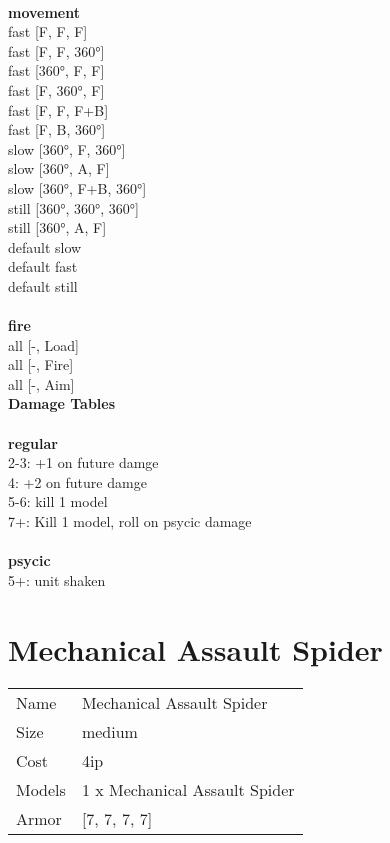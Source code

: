 \ \\ {\bf movement } \\
fast [F, F, F] \\
fast [F, F, 360°] \\
fast [360°, F, F] \\
fast [F, 360°, F] \\
fast [F, F, F+B] \\
fast [F, B, 360°] \\
slow [360°, F, 360°] \\
slow [360°, A, F] \\
slow [360°, F+B, 360°] \\
still [360°, 360°, 360°] \\
still [360°, A, F] \\
default slow \\
default fast \\
default still \\
\ \\ {\bf fire } \\
all [-, Load] \\
all [-, Fire] \\
all [-, Aim] \\


{\bf Damage Tables} \\
\ \\ {\bf regular } \\
2-3: +1 on future damge \\
4: +2 on future damge \\
5-6: kill 1 model \\
7+: Kill 1 model, roll on psycic damage \\
\ \\ {\bf psycic } \\
5+: unit shaken \\










\pagebreak\pagebreak

\section{ Mechanical Assault Spider }

\begin{tabular}{ll}
  Name & Mechanical Assault Spider \\
  Size & medium\\
  Cost & 4ip\\
  Models & 1 x Mechanical Assault Spider\\
  Armor & [7, 7, 7, 7]\\
\end{tabular}

